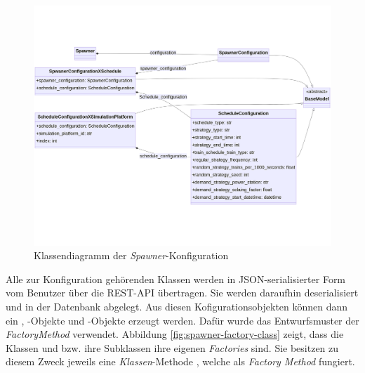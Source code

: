 \begin{figure}[H]
	\centering
	\includegraphics[width=1.0\linewidth]{images/diagrams/spawner-config-class.png}
	\caption{Klassendiagramm der \emph{Spawner}-Konfiguration}
	\label{fig:spawner-config-class}
\end{figure}

Alle zur Konfiguration gehörenden Klassen werden in JSON-serialisierter Form vom Benutzer über die REST-API übertragen\cite{kamp_architektur_2023}. Sie werden daraufhin deserialisiert und in der Datenbank abgelegt. Aus diesen Kofigurationsobjekten können dann ein , -Objekte und -Objekte erzeugt werden. Dafür wurde das Entwurfsmuster der \emph{FactoryMethod} verwendet. Abbildung \ref{fig:spawner-factory-class} zeigt, dass die Klassen  und  bzw. ihre Subklassen ihre eigenen \emph{Factories} sind. Sie besitzen zu diesem Zweck jeweils eine \emph{Klassen}-Methode , welche als \emph{Factory Method} fungiert.

